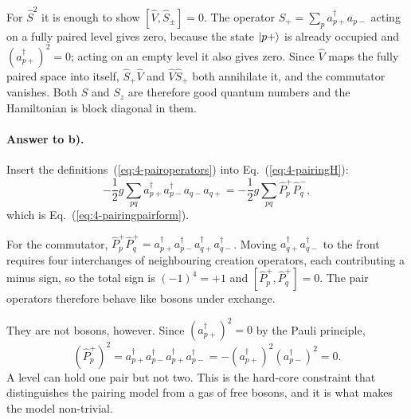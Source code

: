 For $\hat{S}^2$ it is enough to show $[\hat{V},\hat{S}_{\pm}]=0$.  The
operator $\hat{S}_+=\sum_p a^{\dagger}_{p+}a_{p-}$ acting on a fully paired
level gives zero, because the state $\vert p+ \rangle$ is already occupied and
$(a^{\dagger}_{p+})^2=0$; acting on an empty level it also gives zero.  Since
$\hat{V}$ maps the fully paired space into itself,
$\hat{S}_+\hat{V}$ and $\hat{V}\hat{S}_+$ both annihilate it, and the
commutator vanishes.  Both $S$ and $S_z$ are therefore good quantum numbers
and the Hamiltonian is block diagonal in them.

\paragraph{Answer to b).}
Insert the definitions~(\ref{eq:4-pairoperators}) into
Eq.~(\ref{eq:4-pairingH}):
\begin{equation}
  -\frac{1}{2}g\sum_{pq}a^{\dagger}_{p+}a^{\dagger}_{p-}a_{q-}a_{q+}
  = -\frac{1}{2}g\sum_{pq}\hat{P}^{+}_p\hat{P}^{-}_q ,
  \label{eq:4-exp1}
\end{equation}
which is Eq.~(\ref{eq:4-pairingpairform}).

For the commutator, $\hat{P}^{+}_p\hat{P}^{+}_q
= a^{\dagger}_{p+}a^{\dagger}_{p-}a^{\dagger}_{q+}a^{\dagger}_{q-}$.  Moving
$a^{\dagger}_{q+}a^{\dagger}_{q-}$ to the front requires four interchanges of
neighbouring creation operators, each contributing a minus sign, so the total
sign is $(-1)^4=+1$ and $[\hat{P}^{+}_p,\hat{P}^{+}_q]=0$.  The pair operators
therefore behave like bosons under exchange.

They are not bosons, however.  Since
$(a^{\dagger}_{p+})^2=0$ by the Pauli principle,
\begin{equation}
  \left(\hat{P}^{+}_p\right)^2
   = a^{\dagger}_{p+}a^{\dagger}_{p-}a^{\dagger}_{p+}a^{\dagger}_{p-}
   = -\left(a^{\dagger}_{p+}\right)^2
      \left(a^{\dagger}_{p-}\right)^2 = 0 .
  \label{eq:4-exp2}
\end{equation}
A level can hold one pair but not two.  This is the hard-core constraint that
distinguishes the pairing model from a gas of free bosons, and it is what
makes the model non-trivial.

